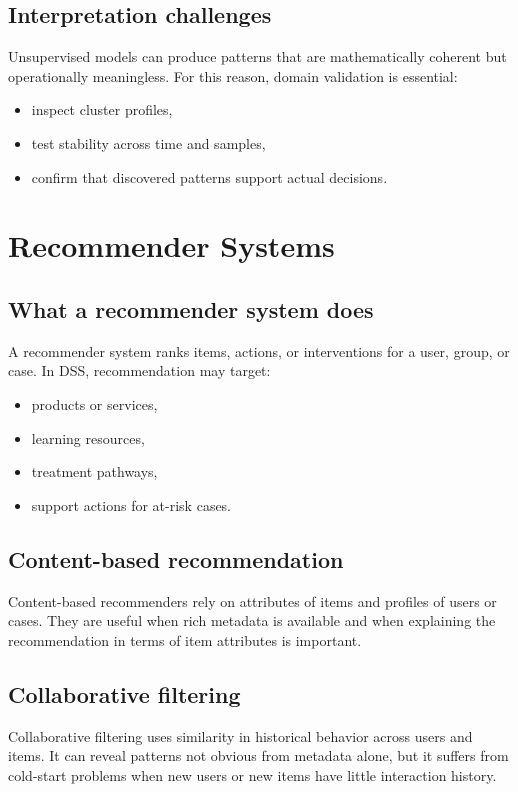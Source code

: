 \subsection{Interpretation challenges}
Unsupervised models can produce patterns that are mathematically coherent but
operationally meaningless. For this reason, domain validation is essential:
\begin{itemize}
  \item inspect cluster profiles,
  \item test stability across time and samples,
  \item confirm that discovered patterns support actual decisions.
\end{itemize}

\section{Recommender Systems}

\subsection{What a recommender system does}
A recommender system ranks items, actions, or interventions for a user, group,
or case. In DSS, recommendation may target:
\begin{itemize}
  \item products or services,
  \item learning resources,
  \item treatment pathways,
  \item support actions for at-risk cases.
\end{itemize}

\subsection{Content-based recommendation}
Content-based recommenders rely on attributes of items and profiles of users or
cases. They are useful when rich metadata is available and when explaining the
recommendation in terms of item attributes is important.

\subsection{Collaborative filtering}
Collaborative filtering uses similarity in historical behavior across users and
items. It can reveal patterns not obvious from metadata alone, but it suffers
from cold-start problems when new users or new items have little interaction
history.

